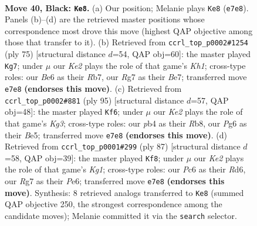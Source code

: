 \documentclass[11pt]{article}
\begin{document}
\clearpage

\begin{figure}[p]\centering
\begin{subfigure}{0.46\textwidth}\centering
\resizebox{\linewidth}{!}{%
\newchessgame
\chessboard[
  setfen={2r5/p1p1k1r1/P1p1b1p1/2P2pRp/1P3P1P/8/8/RN2K3 b Q - 3 40},
  showmover=false,
  pgfstyle=straightmove, color=movearrow, markmove={e7-e8}
]}
\caption{}
\end{subfigure}\hfill
\begin{subfigure}{0.46\textwidth}\centering
\resizebox{\linewidth}{!}{%
\newchessgame
\chessboard[
  setfen={7k/1r2b3/1pRp2pp/pP2p3/P2pP3/B5P1/7P/5K2 b - - 3 38},
  showmover=false,
  pgfstyle=straightmove, color=movearrow, markmove={h8-g7}
]}
\caption{}
\end{subfigure}
\\[4pt]
\begin{subfigure}{0.46\textwidth}\centering
\resizebox{\linewidth}{!}{%
\newchessgame
\chessboard[
  setfen={1r6/4r3/3p2kp/2pPb3/PpN1RpP1/1P6/2R2P2/5K2 b - - 1 48},
  showmover=false,
  pgfstyle=straightmove, color=movearrow, markmove={g6-f6}
]}
\caption{}
\end{subfigure}\hfill
\begin{subfigure}{0.46\textwidth}\centering
\resizebox{\linewidth}{!}{%
\newchessgame
\chessboard[
  setfen={4b1k1/8/3rp1p1/1pR1p1Pp/pP2P2P/5P2/2K5/4N3 b - - 1 44},
  showmover=false,
  pgfstyle=straightmove, color=movearrow, markmove={g8-f8}
]}
\caption{}
\end{subfigure}
\caption{\textbf{Move 40, Black: \texttt{Ke8}.} (a) Our position; Melanie plays \texttt{Ke8} (\texttt{e7e8}). Panels (b)--(d) are the retrieved master positions whose correspondence most drove this move (highest QAP objective among those that transfer to it). (b) Retrieved from \texttt{ccrl\_top\_p0002\#1254} (ply 75) [structural distance $d$=54, QAP obj=60]: the master played \texttt{Kg7}; under $\mu$ our \emph{Ke2} plays the role of that game's \emph{Kh1}; cross-type roles: our \emph{B}e6 as their \emph{R}b7, our \emph{R}g7 as their \emph{B}e7; transferred move \texttt{e7e8} \textbf{(endorses this move)}. (c) Retrieved from \texttt{ccrl\_top\_p0002\#881} (ply 95) [structural distance $d$=57, QAP obj=48]: the master played \texttt{Kf6}; under $\mu$ our \emph{Ke2} plays the role of that game's \emph{Kg3}; cross-type roles: our \emph{p}b4 as their \emph{R}b8, our \emph{P}g6 as their \emph{B}e5; transferred move \texttt{e7e8} \textbf{(endorses this move)}. (d) Retrieved from \texttt{ccrl\_top\_p0001\#299} (ply 87) [structural distance $d$=58, QAP obj=39]: the master played \texttt{Kf8}; under $\mu$ our \emph{Ke2} plays the role of that game's \emph{Kg1}; cross-type roles: our \emph{P}c6 as their \emph{R}d6, our \emph{R}g7 as their \emph{P}e6; transferred move \texttt{e7e8} \textbf{(endorses this move)}. Synthesis: 8 retrieved analogs transferred to \texttt{Ke8} (summed QAP objective 250, the strongest correspondence among the candidate moves); Melanie committed it via the \texttt{search} selector.}
\label{fig:thought-m79}
\end{figure}
\end{document}
